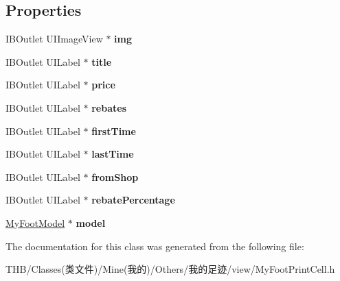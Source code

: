 \subsection*{Properties}
\begin{DoxyCompactItemize}
\item 
\mbox{\label{interface_my_foot_print_cell_a7272cdecf4563987b2614ebbe675b7f8}} 
I\+B\+Outlet U\+I\+Image\+View $\ast$ {\bfseries img}
\item 
\mbox{\label{interface_my_foot_print_cell_aae3bb1fbab053c7c9a5a5f543c2a5143}} 
I\+B\+Outlet U\+I\+Label $\ast$ {\bfseries title}
\item 
\mbox{\label{interface_my_foot_print_cell_a70fb8bdc2d05e7e50b4c042b85ea143b}} 
I\+B\+Outlet U\+I\+Label $\ast$ {\bfseries price}
\item 
\mbox{\label{interface_my_foot_print_cell_a480d61b0d05eae650ef48e2b5f87d997}} 
I\+B\+Outlet U\+I\+Label $\ast$ {\bfseries rebates}
\item 
\mbox{\label{interface_my_foot_print_cell_a7044ff7a91c96e0772941877587966c4}} 
I\+B\+Outlet U\+I\+Label $\ast$ {\bfseries first\+Time}
\item 
\mbox{\label{interface_my_foot_print_cell_ad84e54426f08f087ee543690a2dba9f2}} 
I\+B\+Outlet U\+I\+Label $\ast$ {\bfseries last\+Time}
\item 
\mbox{\label{interface_my_foot_print_cell_a6b26f4731f8db81303b7480c4a57a44a}} 
I\+B\+Outlet U\+I\+Label $\ast$ {\bfseries from\+Shop}
\item 
\mbox{\label{interface_my_foot_print_cell_a9eef53c8e63498787169cf9ac39d8fbb}} 
I\+B\+Outlet U\+I\+Label $\ast$ {\bfseries rebate\+Percentage}
\item 
\mbox{\label{interface_my_foot_print_cell_a136f6064a14b66369abadb9d885f6165}} 
\mbox{\hyperlink{interface_my_foot_model}{My\+Foot\+Model}} $\ast$ {\bfseries model}
\end{DoxyCompactItemize}


The documentation for this class was generated from the following file\+:\begin{DoxyCompactItemize}
\item 
T\+H\+B/\+Classes(类文件)/\+Mine(我的)/\+Others/我的足迹/view/My\+Foot\+Print\+Cell.\+h\end{DoxyCompactItemize}

